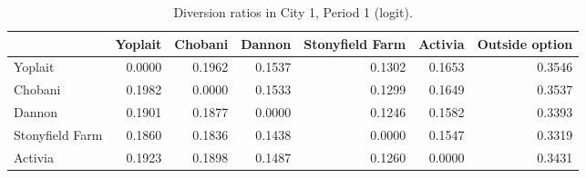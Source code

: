\begin{table}[H]\centering
\caption{Diversion ratios in City 1, Period 1 (logit).}
\label{tab:q5_diversion}
\begin{tabular}{lrrrrrr}
\toprule
 & Yoplait & Chobani & Dannon & Stonyfield Farm & Activia & Outside option \\
\midrule
Yoplait & 0.0000 & 0.1962 & 0.1537 & 0.1302 & 0.1653 & 0.3546 \\
Chobani & 0.1982 & 0.0000 & 0.1533 & 0.1299 & 0.1649 & 0.3537 \\
Dannon & 0.1901 & 0.1877 & 0.0000 & 0.1246 & 0.1582 & 0.3393 \\
Stonyfield Farm & 0.1860 & 0.1836 & 0.1438 & 0.0000 & 0.1547 & 0.3319 \\
Activia & 0.1923 & 0.1898 & 0.1487 & 0.1260 & 0.0000 & 0.3431 \\
\bottomrule
\end{tabular}
\end{table}
